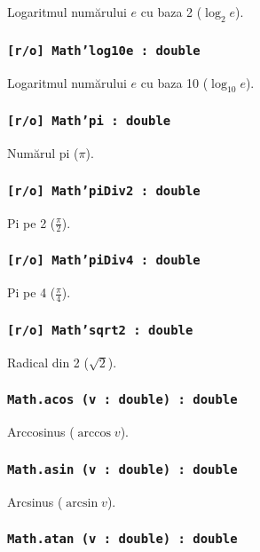 Logaritmul numărului $e$ cu baza 2 ($\log_{2}{e}$).

\subsubsection{\texttt{[r/o] Math'log10e : double}}

Logaritmul numărului $e$ cu baza 10 ($\log_{10}{e}$).

\subsubsection{\texttt{[r/o] Math'pi : double}}

Numărul pi ($\pi$).

\subsubsection{\texttt{[r/o] Math'piDiv2 : double}}

Pi pe 2 ($\frac{\pi}{2}$).

\subsubsection{\texttt{[r/o] Math'piDiv4 : double}}

Pi pe 4 ($\frac{\pi}{4}$).

\subsubsection{\texttt{[r/o] Math'sqrt2 : double}}

Radical din 2 ($\sqrt{2}$).

\subsubsection{\texttt{Math.acos (v : double) : double}}

Arccosinus ($\arccos{v}$).

\subsubsection{\texttt{Math.asin (v : double) : double}}

Arcsinus ($\arcsin{v}$).

\subsubsection{\texttt{Math.atan (v : double) : double}}

